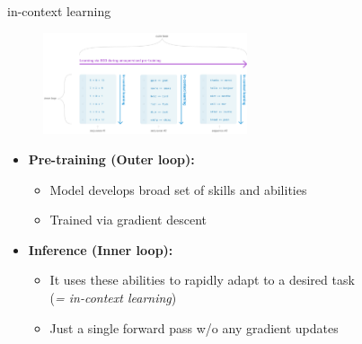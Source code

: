 \begin{frame}{in-context learning}

\vfill

\begin{figure}
		\centering
		\includegraphics[width = 6cm]{figure/twotypesoflearning.png}\\
\end{figure}

\begin{itemize}
	\item \textbf{Pre-training (Outer loop):}
			\begin{itemize}
				\item Model develops broad set of skills and abilities
				\item Trained via gradient descent
			\end{itemize}
	\item \textbf{Inference (Inner loop):}
			\begin{itemize}
				\item It uses these abilities to rapidly adapt to a desired task\\(\textit{= in-context learning})
				\item Just a single forward pass w/o any gradient updates
			\end{itemize}
\end{itemize}

\vfill

\end{frame}


